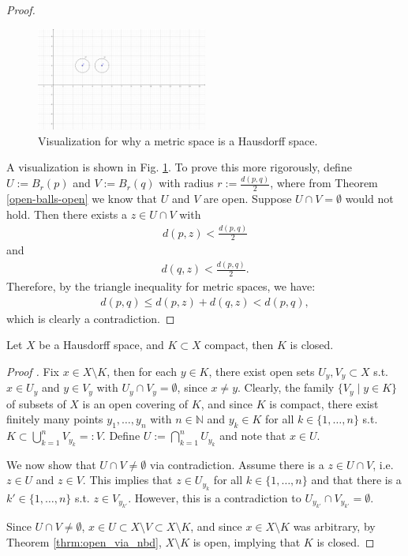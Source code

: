 \begin{proof}
	\begin{figure}[h!]		
		\centering 
		\includegraphics[trim = {3.8cm 5.8cm 9.7cm 2.8cm}, width=0.5\textwidth, clip]{Figures/metric-spaces-Hausdorff-spaces-v2.png}
		\caption{Visualization for why a metric space is a Hausdorff space.}
		\label{metric-space-Hausdorff-space}
	\end{figure} 
	A visualization is shown in Fig. \ref{metric-space-Hausdorff-space}. To prove this more rigorously, define $U := B_{r}(p)$ and $V:=B_{r}(q)$ with radius $r := \frac{d(p, q)}{2}$, where from Theorem \ref{open-balls-open} we know that $U$ and $V$ are open. Suppose $U\cap V = \emptyset$ would not hold. Then there exists a $z\in U\cap V$ with 
	\begin{align}
		d(p, z) < \frac{d(p, q)}{2}
	\end{align}
	and 
	\begin{align}
		d(q, z) < \frac{d(p, q)}{2}. 
	\end{align}
	Therefore, by the triangle inequality for metric spaces, we have: 
	\begin{align}
		d(p, q) \leq d(p, z) + d(q, z) < d(p, q), 
	\end{align}
	which is clearly a contradiction. 
\end{proof}

\begin{theorem}
	Let $X$ be a Hausdorff space, and $K\subset X$ compact, then $K$ is closed.
\end{theorem}

\begin{proof}[Proof \cite{topology-singh, 1329787}]
	Fix $x\in X\setminus K$, then for each $y\in K$, there exist open sets $U_y, V_y\subset X$ s.t. $x\in U_y$ and $y\in V_y$ with $U_y\cap V_y = \emptyset$, since $x\ne y$. Clearly, the family $\{V_{y}\mid y\in K\}$ of subsets of $X$ is an open covering of $K$, and since $K$ is compact, there exist finitely many points $y_1, \dots, y_n$ with $n\in\mathbb N$ and $y_k\in K$ for all $k\in \{1, \dots, n\}$ s.t. $K \subset \bigcup_{k=1}^{n}V_{y_k} =: V$. Define $U := \bigcap_{k=1}^{n}U_{y_k}$ and note that $x\in U$.
	
	We now show that $U \cap V \ne \emptyset$ via contradiction. Assume there is a $z\in U\cap V$, i.e. $z\in U$ and $z\in V$. This implies that $z\in U_{y_k}$ for all $k\in \{1, \dots, n\}$ and that there is a $k'\in\{1, \dots, n\}$ s.t. $z\in V_{y_{k'}}$. However, this is a contradiction to $U_{y_{k'}} \cap V_{y_{k'}} = \emptyset$. 
	
	Since $U\cap V\ne\emptyset$, $x\in U\subset X\setminus V\subset X\setminus K$, and since $x\in X\setminus K$ was arbitrary, by Theorem \ref{thrm:open_via_nbd}, $X\setminus K$ is open, implying that $K$ is closed.
\end{proof}

